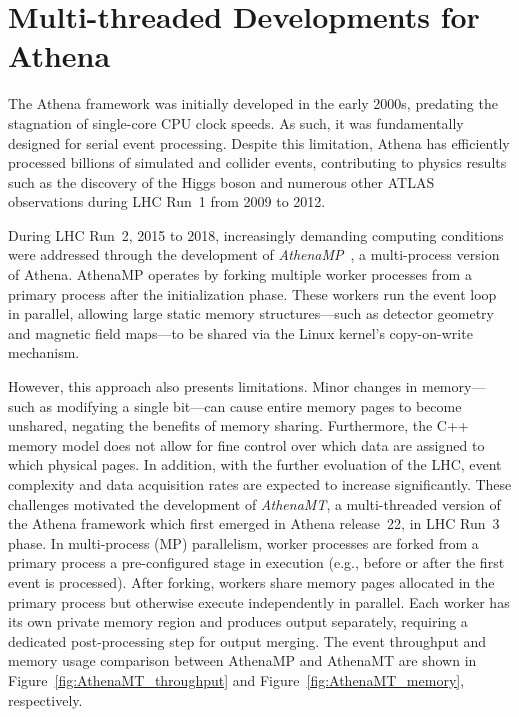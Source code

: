 \section{Multi-threaded Developments for Athena}
The Athena framework was initially developed in the early 2000s, predating the stagnation of single-core CPU clock speeds. As such, it was fundamentally designed for serial event processing. Despite this limitation, Athena has efficiently processed billions of simulated and collider events, contributing to physics results such as the discovery of the Higgs boson and numerous other ATLAS observations during LHC Run~1 from 2009 to 2012.

During LHC Run~2, 2015 to 2018, increasingly demanding computing conditions were addressed through the development of \textit{AthenaMP}~\cite{AthenaMP}, a multi-process version of Athena. AthenaMP operates by forking multiple worker processes from a primary process after the initialization phase. These workers run the event loop in parallel, allowing large static memory structures—such as detector geometry and magnetic field maps—to be shared via the Linux kernel’s copy-on-write mechanism.

However, this approach also presents limitations. Minor changes in memory—such as modifying a single bit—can cause entire memory pages to become unshared, negating the benefits of memory sharing. Furthermore, the C++ memory model does not allow for fine control over which data are assigned to which physical pages. In addition, with the further evoluation of the LHC, event complexity and data acquisition rates are expected to increase significantly. These challenges motivated the development of \textit{AthenaMT}, a multi-threaded version of the Athena framework which first emerged in Athena release~22, in LHC Run~3 phase. In multi-process (MP) parallelism, worker processes are forked from a primary process a pre-configured stage in execution (e.g., before or after the first event is processed). After forking, workers share memory pages allocated in the primary process but otherwise execute independently in parallel. Each worker has its own private memory region and produces output separately, requiring a dedicated post-processing step for output merging. The event throughput and memory usage comparison between AthenaMP and AthenaMT are shown in Figure~\ref{fig:AthenaMT_throughput} and Figure~\ref{fig:AthenaMT_memory}, respectively.

